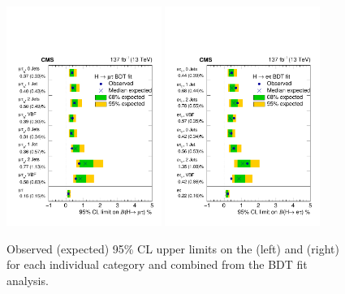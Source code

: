 \begin{figure}[htbp!]
  \centering
  \includegraphics[width=0.45\textwidth]{plots/chapter9/limits/BDTMu.pdf}
  \includegraphics[width=0.45\textwidth]{plots/chapter9/limits/BDTE.pdf} \\
  \caption{Observed (expected) 95\% CL upper limits on the \BHmt (left) and \BHet (right) for each individual category and combined from the BDT fit analysis.}
  \label{fig:bdt_limits}
\end{figure}

